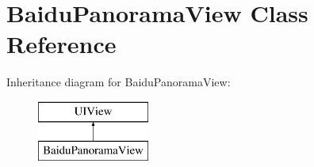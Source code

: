 \hypertarget{interface_baidu_panorama_view}{}\section{Baidu\+Panorama\+View Class Reference}
\label{interface_baidu_panorama_view}
Inheritance diagram for Baidu\+Panorama\+View\+:\begin{figure}[H]
\begin{center}
\leavevmode
\includegraphics[height=2.000000cm]{interface_baidu_panorama_view}
\end{center}
\end{figure}
